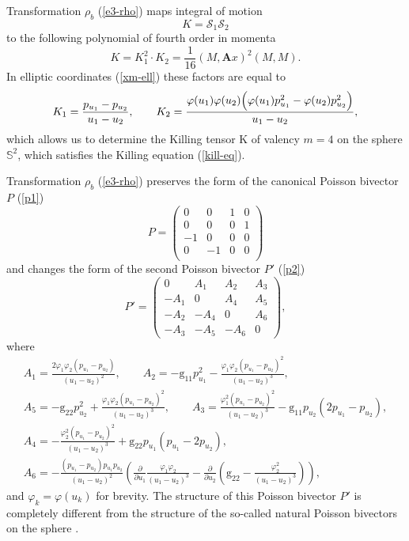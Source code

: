 \documentclass[pdftex]{sigma}
\numberwithin{equation}{section}
\begin{document}
Transformation $\rho_b$ (\ref{e3-rho}) maps integral of motion
\[K=\mathcal{S}_1 \mathcal{S}_2\]
to the following polynomial of fourth order in momenta
\[K =K_1^2\cdot K_2=\dfrac{1}{16}(M,\mathbf Ax)^2(M,M) .\]
In elliptic coordinates (\ref{xm-ell}) these factors are equal to
\begin{equation}\label{K}
 K_1=\frac{p_{u_1}-p_{u_2}}{u_1-u_2} , \qquad K_2=\frac{\varphi(u_1)\varphi(u_2)\Bigl(\varphi(u_1)p_{u_1}^2-\varphi(u_2)p_{u_2}^2\Bigr)}{u_1-u_2} ,
\end{equation}
which allows us to determine the Killing tensor $\mathrm K$ of valency $m=4$ on the sphere $\mathbb S^2$, which satisfies the Killing equation (\ref{kill-eq}).

Transformation $\rho_b$ (\ref{e3-rho}) preserves the form of the canonical Poisson bivector $P$ (\ref{p1})
\begin{equation}\label{pp1}
P=\left(
 \begin{array}{cccc}
 0 & 0 & 1 & 0 \\
 0 & 0 & 0 & 1 \\
 -1 & 0 & 0 & 0 \\
 0 & -1 & 0 & 0 \\
 \end{array}
 \right)
\end{equation}
and changes the form of the second Poisson bivector $P'$ (\ref{p2})
\begin{equation}\label{pp2}
P'=\left(
 \begin{matrix}
 0 & A_1 & A_2 & A_3 \\
 -A_1 & 0 & A_4 & A_5 \\
 -A_2 & -A_4 & 0 & A_6 \\
 -A_3 & -A_5 & -A_6 & 0
 \end{matrix}
 \right),
\end{equation}
where
\begin{gather*}
A_1=\frac{2\varphi_1\varphi_2(p_{u_1} - p_{u_2})}{(u_1 - u_2)^2} ,\qquad  A_2=-\mathrm g_{11}p_{u_1}^2 -\frac{\varphi_1\varphi_2(p_{u_1} - p_{u_2})^2}{(u_1 - u_2)^3} ,  \\
A_5=-\mathrm g_{22}p_{u_2}^2+\frac{\varphi_1\varphi_2(p_{u_1} - p_{u_2})^2}{(u_1 - u_2)^3} ,
\qquad
A_3=\frac{\varphi_1^2(p_{u_1} - p_{u_2})^2}{(u_1 - u_2)^3}-\mathrm g_{11}p_{u_2}(2p_{u_1} - p_{u_2}) ,\\
 A_4=-\frac{\varphi_2^2(p_{u_1} - p_{u_2})^2}{(u_1 - u_2)^3}+\mathrm g_{22}p_{u_1}(p_{u_1} - 2p_{u_2}),
 \\
A_6=-\frac{(p_{u_1} - p_{u_2})p_{u_1}p_{u_2}}{(u_1 - u_2)^2}\left( \frac{\partial}{\partial u_1}\frac{\varphi_1\varphi_2}{(u_1-u_2)^3}-\frac{\partial}{\partial u_2} \left(\mathrm g_{22}-\frac{\varphi_2^2}{(u_1-u_2)^3}\right) \right) ,
\end{gather*}
and $\varphi_k=\varphi(u_k)$ for brevity. The structure of this Poisson bivector $P'$ is completely different from the structure of the so-called natural Poisson bivectors on the sphere \cite{ts11,vt09}.
\end{document}
